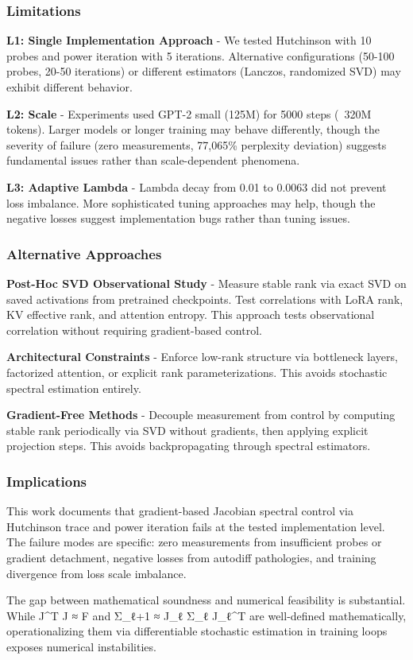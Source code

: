 
\subsubsection{Limitations}

\textbf{L1: Single Implementation Approach} - We tested Hutchinson with 10 probes and power iteration with 5 iterations. Alternative configurations (50-100 probes, 20-50 iterations) or different estimators (Lanczos, randomized SVD) may exhibit different behavior.

\textbf{L2: Scale} - Experiments used GPT-2 small (125M) for 5000 steps (~320M tokens). Larger models or longer training may behave differently, though the severity of failure (zero measurements, 77,065\% perplexity deviation) suggests fundamental issues rather than scale-dependent phenomena.

\textbf{L3: Adaptive Lambda} - Lambda decay from 0.01 to 0.0063 did not prevent loss imbalance. More sophisticated tuning approaches may help, though the negative losses suggest implementation bugs rather than tuning issues.

\subsubsection{Alternative Approaches}

\textbf{Post-Hoc SVD Observational Study} - Measure stable rank via exact SVD on saved activations from pretrained checkpoints. Test correlations with LoRA rank, KV effective rank, and attention entropy. This approach tests observational correlation without requiring gradient-based control.

\textbf{Architectural Constraints} - Enforce low-rank structure via bottleneck layers, factorized attention, or explicit rank parameterizations. This avoids stochastic spectral estimation entirely.

\textbf{Gradient-Free Methods} - Decouple measurement from control by computing stable rank periodically via SVD without gradients, then applying explicit projection steps. This avoids backpropagating through spectral estimators.

\subsubsection{Implications}

This work documents that gradient-based Jacobian spectral control via Hutchinson trace and power iteration fails at the tested implementation level. The failure modes are specific: zero measurements from insufficient probes or gradient detachment, negative losses from autodiff pathologies, and training divergence from loss scale imbalance.

The gap between mathematical soundness and numerical feasibility is substantial. While J^T J ≈ F and Σ_{ℓ+1} ≈ J_ℓ Σ_ℓ J_ℓ^T are well-defined mathematically, operationalizing them via differentiable stochastic estimation in training loops exposes numerical instabilities.

